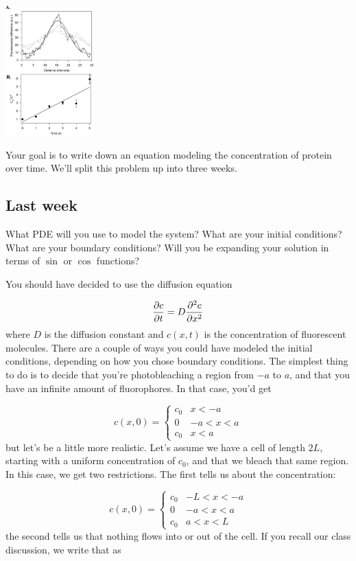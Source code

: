 \documentclass[12pt]{article}
\begin{document}
\includegraphics[trim = 10mm 300mm 00mm 30mm, clip, height=50mm]{F6_large.pdf}

Your goal is to write down an equation modeling the concentration of
protein over time. We'll split this problem up into three weeks. 

\subsection{Last week}
What PDE will you use to model the system? What are your initial
conditions? What are your boundary conditions? Will you be expanding
your solution in terms of $\sin$ or $\cos$ functions?

You should have decided to use the diffusion equation

\begin{equation}
  \label{eq:diff}
  \frac{\partial c}{\partial t} = D\frac{\partial^2 c}{\partial x^2}
\end{equation}
where $D$ is the diffusion constant and $c(x,t)$ is the concentration
of fluorescent molecules. There are a couple of ways you could have
modeled the initial conditions, depending on how you chose boundary
conditions. The simplest thing to do is to decide that you're
photobleaching a region from $-a$ to $a$, and that you have an
infinite amount of fluorophores. In that case, you'd get

\begin{equation*}
c(x,0) = \left\{\begin{matrix}
 c_0 & x < -a\\ 
 0 &-a < x < a\\ 
 c_0  &x < a
\end{matrix}\right.
\end{equation*}
but let's be a little more realistic. Let's assume we have a cell of
length $2L$, starting with a uniform concentration of $c_0$, and that
we bleach that same region. In this case, we get two restrictions. The
first tells us about the concentration:

\begin{equation}
\label{eq:cond1}
c(x,0) = \left\{\begin{matrix}
 c_0 &-L < x < -a\\ 
 0 &-a < x < a\\ 
 c_0  &a < x < L 
\end{matrix}\right.
\end{equation}
the second tells us that nothing flows into or out of the cell. If you
recall our class discussion, we write that as
\end{document}
